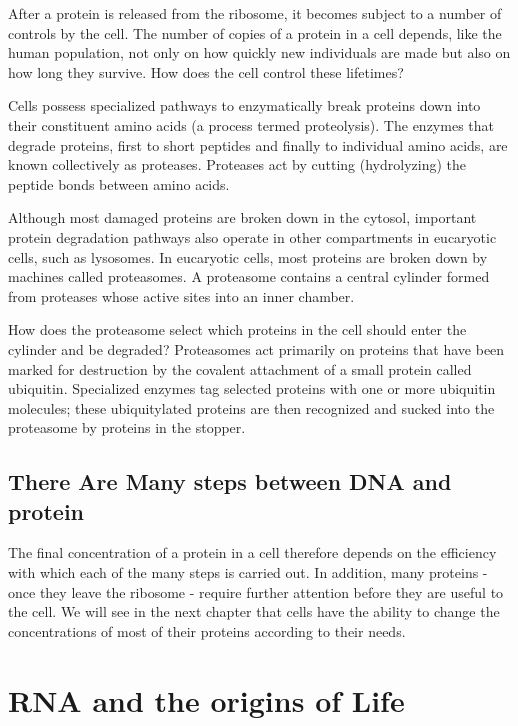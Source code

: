 After a protein is released from the ribosome, it becomes subject to a
number of controls by the cell. The number of copies of a protein in a cell
depends, like the human population, not only on how quickly new individuals
are made but also on how long they survive. How does the cell control these lifetimes?

Cells possess specialized pathways to enzymatically break proteins
down into their constituent amino acids (a process termed proteolysis).
The enzymes that degrade proteins, first to short peptides and finally to
individual amino acids, are known collectively as proteases. Proteases
act by cutting (hydrolyzing) the peptide bonds between amino acids.

Although most damaged proteins are broken down in the cytosol,
important protein degradation pathways also operate in other compartments
in eucaryotic cells, such as lysosomes.
In eucaryotic cells, most proteins are broken down by machines called
proteasomes. A proteasome contains a central cylinder formed from
proteases whose active sites into an inner chamber.

How does the proteasome select which proteins in the cell should enter
the cylinder and be degraded? Proteasomes act primarily on proteins that
have been marked for destruction by the covalent attachment of a small
protein called ubiquitin. Specialized enzymes tag selected proteins with
one or more ubiquitin molecules; these ubiquitylated proteins are then
recognized and sucked into the proteasome by proteins in the stopper.

\subsection{There Are Many steps between DNA and protein}

The final concentration of a protein in
a cell therefore depends on the efficiency with which each of the many
steps is carried out. In addition, many proteins - once they leave the
ribosome - require further attention before they are useful to the cell.
We will see in the next chapter that cells have the ability to change the
concentrations of most of their proteins according to their needs.

\section{RNA and the origins of Life}

